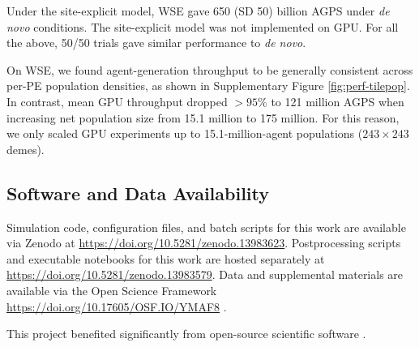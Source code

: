 Under the site-explicit model, WSE gave 650 (SD 50) billion AGPS under \textit{de novo} conditions.
The site-explicit model was not implemented on GPU.
For all the above, 50/50 trials gave similar performance to \textit{de novo}.

On WSE, we found agent-generation throughput to be generally consistent across per-PE population densities, as shown in Supplementary Figure \ref{fig:perf-tilepop}.
In contrast, mean GPU throughput dropped $>95\%$ to 121 million AGPS when increasing net population size from 15.1 million to 175 million.
For this reason, we only scaled GPU experiments up to 15.1-million-agent populations ($243 \times 243$ demes).

\subsection{Software and Data Availability} \label{sec:materials}

Simulation code, configuration files, and batch scripts for this work are available via Zenodo at \url{https://doi.org/10.5281/zenodo.13983623}.
Postprocessing scripts and executable notebooks for this work are hosted separately at \url{https://doi.org/10.5281/zenodo.13983579}.
Data and supplemental materials are available via the Open Science Framework \url{https://doi.org/10.17605/OSF.IO/YMAF8} \citep{foster2017open}.

This project benefited significantly from open-source scientific software \citep{2020SciPy-NMeth,harris2020array,reback2020pandas,mckinney-proc-scipy-2010,waskom2021seaborn,hunter2007matplotlib,moreno2023teeplot}.
